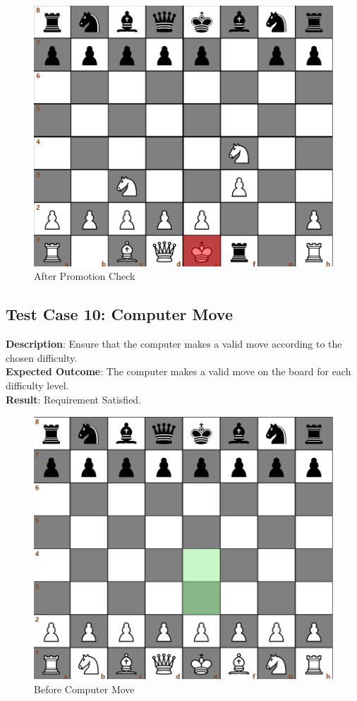 \documentclass[a4paper,12pt]{article}
\begin{document}
\begin{figure}[H]
    \centering
    \includegraphics[width=0.6\linewidth]{Images/Test Cases/testCase9Img2.png}
    \caption{After Promotion Check}
    \label{fig:AfterPromotionCheck}
\end{figure}

\subsection{Test Case 10: Computer Move}
\textbf{Description}: Ensure that the computer makes a valid move according to the chosen difficulty.\\
\textbf{Expected Outcome}: The computer makes a valid move on the board for each difficulty level.\\
\textbf{Result}: Requirement Satisfied.

\begin{figure}[H]
    \centering
    \includegraphics[width=0.6\linewidth]{Images/Test Cases/testCase10Img1.png}
    \caption{Before Computer Move}
    \label{fig:BeforeComputerMove}
\end{figure}
\end{document}
